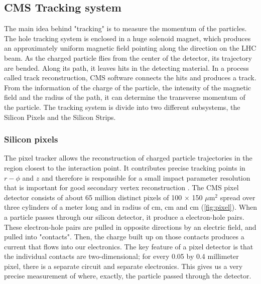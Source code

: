 \subsection{CMS Tracking system}

The main idea behind "tracking" is to measure the momentum of the particles. The hole tracking system is enclosed in a huge solenoid magnet, which produces an approximately uniform magnetic field pointing along the direction on the LHC beam. As the charged particle flies from the center of the detector, its trajectory are bended. Along its path, it leaves hits in the detecting material. In a process called track reconstruction, CMS software connects the hits and produces a track. From the information of the charge of the particle, the intensity of the magnetic field and the radius of the path, it can determine the transverse momentum of the particle. The tracking system is divide into two different subsystems, the Silicon Pixels and the Silicon Strips.

\subsubsection{Silicon pixels} \label{pixel}

The pixel tracker allows the reconstruction of charged particle trajectories in the region closest
to the interaction point. It contributes precise tracking points in $r-\phi$ and $z$ and therefore is responsible for a small impact parameter resolution that is important for good secondary vertex reconstruction \cite{1748-0221-3-08-S08004}.
The CMS pixel detector consists of about 65 million distinct pixels of 100 $\times$ 150 $\mu$m$^{2}$ spread over three cylinders of a meter long and in radius of \unit[4]{cm}, \unit[7]{cm} and \unit[10]{cm} (\cref{fig:pixel}).
When a particle passes through our silicon detector, it produce a electron-hole pairs. These electron-hole pairs are pulled in opposite directions by an electric field, and pulled into "contacts". Then, the charge built up on those contacts produces a current that flows into our electronics. The key feature of a pixel detector is that the individual contacts are two-dimensional; for every 0.05 by 0.4 millimeter pixel, there is a separate circuit and separate electronics. This gives us a very precise measurement of where, exactly, the particle passed through the detector.

